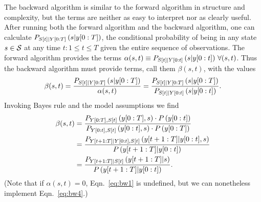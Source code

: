 The  backward algorithm is similar to the
forward algorithm in structure and complexity, but the terms are
neither as easy to interpret nor as clearly useful.  After running
both the forward algorithm and the backward algorithm, one can
calculate $P_{{S}{[t]}|Y[0:T]} \left(s|y[0:T] \right)$,
the conditional probability of being in any state $s \in \states$ at
any time $t: 1\leq t \leq T$ given the entire sequence of
observations.  The forward algorithm provides the terms $\alpha(s,t)
\equiv P_{{S}{[t]}|Y[0:t]} \left(s|y[0:t] \right)\,
\forall (s,t)$.  Thus the backward algorithm must provide terms, call
them $\beta(s,t)$, with the values
\begin{equation}
  \label{eq:bw1} \beta(s,t) =
  \frac{P_{{S}{[t]}|Y[0:T]} \left(s|y[0:T] \right)}
  {\alpha(s,t)} = \frac{P_{{S}{[t]}|Y[0:T]}
    \left(s|y[0:T] \right)}
  {P_{{S}{[t]}|Y[0:t]} \left(s|y[0:t] \right)}.
\end{equation}
Invoking Bayes rule and the model assumptions we find
\begin{align}
  \mlabel{eq:bw2} \beta(s,t) &= \frac{P_{\ts{Y}{0}{T},\ti{S}{t}}
    \left(\ts{y}{0}{T},s \right)\cdot P \left(\ts{y}{0}{t} \right)}
  {P_{\ts{Y}{0}{t},\ti{S}{t}}
    \left(\ts{y}{0}{t},s \right)\cdot P \left(\ts{y}{0}{T} \right)}\\
  \mlabel{eq:bw3} &= \frac{P_{\ts{Y}{t+1}{T}|\ts{Y}{0}{t},\ti{S}{t}}
    \left(\ts{y}{t+1}{T}|\ts{y}{0}{t},s \right)} {P
    \left(\ts{y}{t+1}{T}|\ts{y}{0}{t} \right)}\\
  \label{eq:bw4}
  & = \frac{P_{\ts{Y}{t+1}{T}|\ti{S}{t}} \left(\ts{y}{t+1}{T}|s
    \right)} {P \left(\ts{y}{t+1}{T}|\ts{y}{0}{t} \right)}.
\end{align}
(Note that if $\alpha(s,t)=0$, Eqn.~\eqref{eq:bw1} is undefined, but
we can nonetheless implement Eqn.~\eqref{eq:bw4}.)


